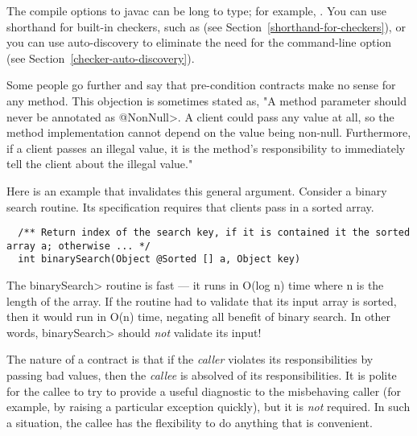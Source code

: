 \begin{sloppypar}
The compile options to javac can be long to type; for example,
.
You can use shorthand for built-in checkers, such as  (see Section~\ref{shorthand-for-checkers}), or you can use
auto-discovery to eliminate the need for the  command-line
option (see Section~\ref{checker-auto-discovery}).
\end{sloppypar}



Some people go further and say that pre-condition contracts make no sense
for any method.  This objection is sometimes stated as, "A method parameter
should never be annotated as \<@NonNull>.  A client could pass any value at
all, so the method implementation cannot depend on the value being
non-null.  Furthermore, if a client passes an illegal value, it is the
method's responsibility to immediately tell the client about the illegal
value."

Here is an example that invalidates this general argument.  Consider a
binary search routine.  Its specification requires that clients pass in a
sorted array.

\begin{smaller}
\begin{Verbatim}
  /** Return index of the search key, if it is contained it the sorted array a; otherwise ... */
  int binarySearch(Object @Sorted [] a, Object key)
\end{Verbatim}
\end{smaller}

The \<binarySearch> routine is fast --- it runs in O(log n) time where n is
the length of the array.  If the routine had to validate that its input
array is sorted, then it would run in O(n) time, negating all benefit of
binary search.  In other words, \<binarySearch> should \emph{not} validate
its input!

The nature of a contract is that if the \emph{caller} violates its
responsibilities by passing bad values, then the \emph{callee} is absolved
of its responsibilities.  It is polite for the callee to try to provide a
useful diagnostic to the misbehaving caller (for example, by raising a
particular exception quickly), but it is \emph{not} required.  In such a
situation, the callee has the flexibility to do anything that is
convenient.

